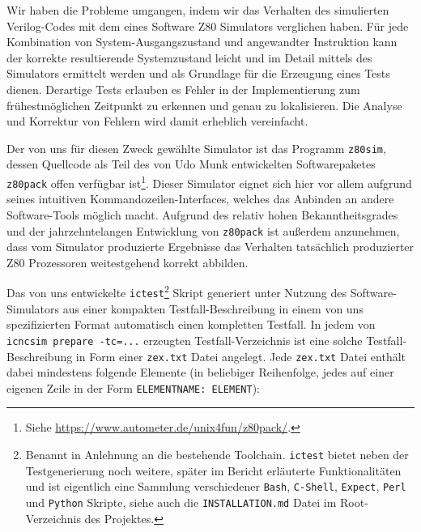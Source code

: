 \documentclass[ngerman, cd=lightcolor]{tudscrreprt}
\begin{document}
Wir haben die Probleme umgangen, indem wir das Verhalten des
simulierten Verilog-Codes mit dem eines Software Z80 Simulators verglichen
haben. Für jede Kombination von System-Ausgangszustand und angewandter
Instruktion kann der korrekte resultierende Systemzustand leicht und im Detail
mittels des Simulators ermittelt werden und als Grundlage für die Erzeugung
eines Tests dienen. Derartige Tests erlauben es Fehler in der Implementierung
zum frühestmöglichen Zeitpunkt zu erkennen und genau zu lokalisieren. Die
Analyse und Korrektur von Fehlern wird damit erheblich vereinfacht.

Der von uns für diesen Zweck gewählte Simulator ist das Programm
\texttt{z80sim}, dessen Quellcode als Teil des von Udo Munk entwickelten
Softwarepaketes \texttt{z80pack} offen verfügbar ist\footnote{Siehe
\url{https://www.autometer.de/unix4fun/z80pack/}.}. Dieser Simulator eignet
sich hier vor allem aufgrund seines intuitiven Kommandozeilen-Interfaces,
welches das Anbinden an andere Software-Tools möglich macht. Aufgrund des
relativ hohen Bekanntheitsgrades und der jahrzehntelangen Entwicklung von
\texttt{z80pack} ist außerdem anzunehmen, dass vom Simulator produzierte
Ergebnisse das Verhalten tatsächlich produzierter Z80 Prozessoren weitestgehend
korrekt abbilden.

Das von uns entwickelte \texttt{ictest}\footnote{Benannt in Anlehnung an die
bestehende Toolchain. \texttt{ictest} bietet neben der Testgenerierung noch
weitere, später im Bericht erläuterte Funktionalitäten und ist eigentlich eine
Sammlung verschiedener \texttt{Bash}, \texttt{C-Shell}, \texttt{Expect},
\texttt{Perl} und \texttt{Python} Skripte, siehe auch die
\texttt{INSTALLATION.md} Datei im Root-Verzeichnis des Projektes.} Skript
generiert unter Nutzung des Software-Simulators aus einer kompakten
Testfall-Beschreibung in einem von uns spezifizierten Format automatisch einen
kompletten Testfall. In jedem von \texttt{icncsim prepare -tc=...} erzeugten
Testfall-Verzeichnis ist eine solche Testfall-Beschreibung in Form einer
\texttt{zex.txt} Datei angelegt. Jede \texttt{zex.txt} Datei enthält dabei
mindestens folgende Elemente (in beliebiger Reihenfolge, jedes auf einer eigenen
Zeile in der Form \texttt{ELEMENTNAME: ELEMENT}):
\end{document}
